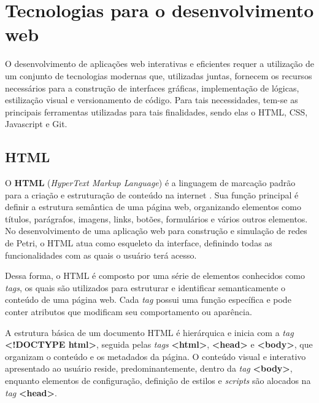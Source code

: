\documentclass[
	12pt,				%
	openright,			%
	oneside,			%
	a4paper,			%
	english,			%
	brazil				%
	]{abntex2}
\begin{document}

\section{Tecnologias para o desenvolvimento web} \label{cap:tecnologiaweb}

O desenvolvimento de aplicações web interativas e eficientes requer a utilização de um conjunto de tecnologias modernas que, utilizadas juntas, fornecem os recursos necessários para a construção de interfaces gráficas, implementação de lógicas, estilização visual e versionamento de código. Para tais necessidades, tem-se as principais ferramentas utilizadas para tais finalidades, sendo elas o HTML, CSS, Javascript e Git. 

\subsection*{HTML}

O \textbf{HTML} (\textit{HyperText Markup Language}) é a linguagem de marcação padrão para a criação e estruturação de conteúdo na internet \cite{mdn_html}. Sua função principal é definir a estrutura semântica de uma página web, organizando elementos como títulos, parágrafos, imagens, links, botões, formulários e vários outros elementos. No desenvolvimento de uma aplicação web para construção e simulação de redes de Petri, o HTML atua como esqueleto da interface, definindo todas as funcionalidades com as quais o usuário terá acesso. 
  
Dessa forma, o HTML é composto por uma série de elementos conhecidos como \textit{tags}, os quais são utilizados para estruturar e identificar semanticamente o conteúdo de uma página web. Cada {\textit{tag}} possui uma função específica e pode conter atributos que modificam seu comportamento ou aparência.

A estrutura básica de um documento HTML é hierárquica e inicia com a \textit{tag} \textbf{<!DOCTYPE html>}, seguida pelas \textit{tags} \textbf{<html>}, \textbf{<head>} e \textbf{<body>}, que organizam o conteúdo e os metadados da página. O conteúdo visual e interativo apresentado ao usuário reside, predominantemente, dentro da \textit{tag} \textbf{<body>}, enquanto elementos de configuração, definição de estilos e \textit{scripts} são alocados na \textit{tag} \textbf{<head>}. 
\end{document}
